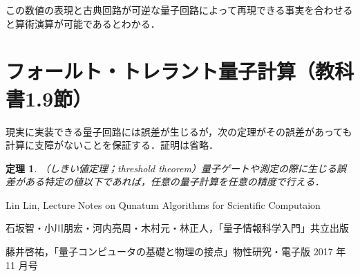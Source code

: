 \documentclass[dvipdfmx]{jarticle}
\numberwithin{equation}{section}
\theoremstyle{seminar}
\newtheorem{theorem}{定理}[section]
\newtheorem{definition}{定義}[section]
\begin{document}
この数値の表現と古典回路が可逆な量子回路によって再現できる事実を合わせると算術演算が可能であるとわかる．

\section{フォールト・トレラント量子計算（教科書1.9節）}
現実に実装できる量子回路には誤差が生じるが，次の定理がその誤差があっても計算に支障がないことを保証する．証明は省略．
\begin{theorem}
  （しきい値定理；threshold theorem）量子ゲートや測定の際に生じる誤差がある特定の値以下であれば，任意の量子計算を任意の精度で行える．
\end{theorem}


\begin{thebibliography}{9}
  \item  Lin Lin, Lecture Notes on Qunatum Algorithms for Scientific Computaion
  \item  石坂智・小川朋宏・河内亮周・木村元・林正人，「量子情報科学入門」共立出版
  \item  藤井啓祐，「量子コンピュータの基礎と物理の接点」物性研究・電子版 2017 年 11 月号
\end{thebibliography}
\end{document}
